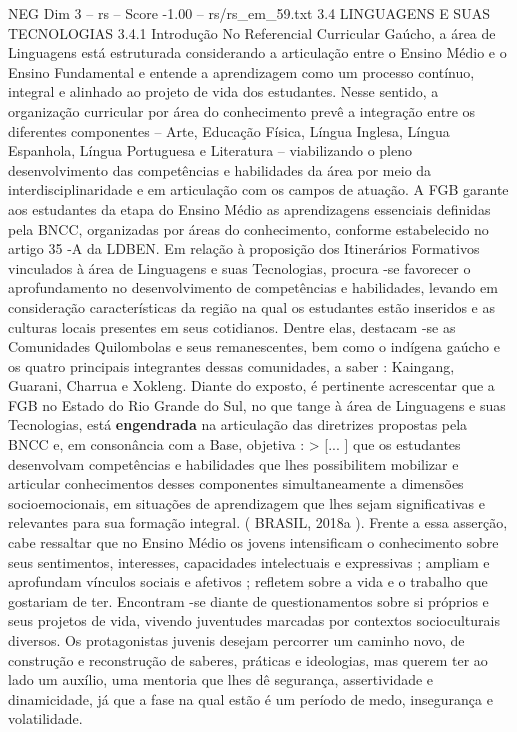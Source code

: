 \begin{textsample}{NEG Dim 3 – rs – Score -1.00 – rs/rs\_em\_59.txt}  \label{ex:f3_neg_042}
3.4 LINGUAGENS E SUAS TECNOLOGIAS 3.4.1 Introdução No Referencial Curricular Gaúcho, a área de Linguagens está estruturada considerando a articulação entre o Ensino Médio e o Ensino Fundamental e entende a aprendizagem como um processo contínuo, integral e alinhado ao projeto de vida dos estudantes.
Nesse sentido, a organização curricular por área do conhecimento prevê a integração entre os diferentes componentes – Arte, Educação Física, Língua Inglesa, Língua Espanhola, Língua Portuguesa e Literatura – viabilizando o pleno desenvolvimento das competências e habilidades da área por meio da interdisciplinaridade e em articulação com os campos de atuação.
A FGB garante aos estudantes da etapa do Ensino Médio as aprendizagens essenciais definidas pela BNCC, organizadas por áreas do conhecimento, conforme estabelecido no artigo 35 -A da LDBEN.
Em relação à proposição dos Itinerários Formativos vinculados à área de Linguagens e suas Tecnologias, procura -se favorecer o aprofundamento no desenvolvimento de competências e habilidades, levando em consideração características da região na qual os estudantes estão inseridos e as culturas locais presentes em seus cotidianos.
Dentre elas, destacam -se as Comunidades Quilombolas e seus remanescentes, bem como o indígena gaúcho e os quatro principais integrantes dessas comunidades, a saber : Kaingang, Guarani, Charrua e Xokleng.
Diante do exposto, é pertinente acrescentar que a FGB no Estado do Rio Grande do Sul, no que tange à área de Linguagens e suas Tecnologias, está \textbf{engendrada} na articulação das diretrizes propostas pela BNCC e, em consonância com a Base, objetiva : > [... ] que os estudantes desenvolvam competências e habilidades que lhes possibilitem mobilizar e articular conhecimentos desses componentes simultaneamente a dimensões socioemocionais, em situações de aprendizagem que lhes sejam significativas e relevantes para sua formação integral. ( BRASIL, 2018a ).
Frente a essa asserção, cabe ressaltar que no Ensino Médio os jovens intensificam o conhecimento sobre seus sentimentos, interesses, capacidades intelectuais e expressivas ; ampliam e aprofundam vínculos sociais e afetivos ; refletem sobre a vida e o trabalho que gostariam de ter.
Encontram -se diante de questionamentos sobre si próprios e seus projetos de vida, vivendo juventudes marcadas por contextos socioculturais diversos.
Os protagonistas juvenis desejam percorrer um caminho novo, de construção e reconstrução de saberes, práticas e ideologias, mas querem ter ao lado um auxílio, uma mentoria que lhes dê segurança, assertividade e dinamicidade, já que a fase na qual estão é um período de medo, insegurança e volatilidade.

\end{textsample}
